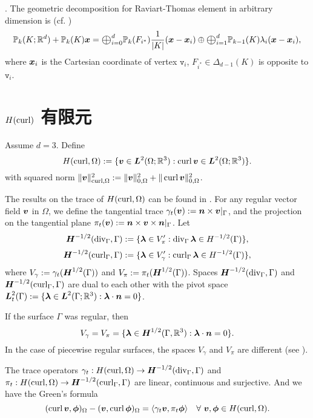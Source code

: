 .
The geometric decomposition for Raviart-Thomas element in arbitrary dimension is (cf. \cite{ArnoldFalkWinther2009})
$$
\mathbb P_k(K;\mathbb R^d)+\mathbb P_k(K)\bs x=\Oplus_{i=0}^d\mathbb P_{k}(F_{i^*})\frac{1}{|K|}(\bs x-\bs x_i) \oplus \Oplus_{i=1}^d\mathbb P_{k-1}(K)\lambda_i(\bs x-\bs x_i),
$$
where $\boldsymbol x_i$ is the Cartesian coordinate of vertex $\texttt{v}_i$, $F_{i^*}\in\Delta_{d-1}(K)$ is opposite to $\texttt{v}_i$.



\section{$H(\operatorname{curl})$ 有限元}

Assume $d=3$.
Define
\[
H(\operatorname{curl},\Omega):=\{\boldsymbol v\in \boldsymbol L^2(\Omega;\mathbb R^3): \operatorname{curl}\boldsymbol v\in \boldsymbol L^2(\Omega;\mathbb R^3)\}.
\]
with squared  norm $\|\boldsymbol v\|_{\operatorname{curl}, \Omega}^2:=\|\boldsymbol v\|_{0, \Omega}^2+\|\operatorname{curl}\boldsymbol v\|_{0, \Omega}^2$.

The results on the trace of $H(\operatorname{curl},\Omega)$ can be found in \cite{BuffaCostabelSheen2002,BuffaCiarlet2001,BuffaCiarlet2001a}.
 For any regular vector field $\boldsymbol v$ in $\Omega$, we define the tangential trace $\gamma_{t}(\boldsymbol v):=\boldsymbol n\times \boldsymbol v|_{\Gamma}$, and the projection on the tangential plane $\pi_{t}(\boldsymbol v):=\boldsymbol n\times\boldsymbol v\times  \boldsymbol n|_{\Gamma}$. Let
 \[
 \boldsymbol H^{-1/2}(\operatorname{div}_{\Gamma}, \Gamma):=\{\boldsymbol\lambda\in V_{\pi}': \operatorname{div}_{\Gamma}\boldsymbol\lambda\in H^{-1/2}(\Gamma)\},
 \]
 \[
 \boldsymbol H^{-1/2}(\operatorname{curl}_{\Gamma}, \Gamma):=\{\boldsymbol\lambda\in V_{\gamma}': \operatorname{curl}_{\Gamma}\boldsymbol\lambda\in H^{-1/2}(\Gamma)\},
 \]
 where $V_{\gamma}:=\gamma_{t}(\boldsymbol H^{1/2}(\Gamma))$ and $V_{\pi}:=\pi_{t}(\boldsymbol H^{1/2}(\Gamma))$.
Spaces $ \boldsymbol H^{-1/2}(\operatorname{div}_{\Gamma}, \Gamma)$ and $ \boldsymbol H^{-1/2}(\operatorname{curl}_{\Gamma}, \Gamma)$ are dual to each other with the pivot space $\boldsymbol L_t^2(\Gamma):=\{\boldsymbol \lambda\in\boldsymbol L^2(\Gamma;\mathbb R^3): \boldsymbol \lambda\cdot\boldsymbol n=0\}$.

If the surface $\Gamma$ was regular, then
\[
V_{\gamma}=V_{\pi}=\{\boldsymbol\lambda\in\boldsymbol H^{1/2}(\Gamma, \mathbb R^3): \boldsymbol\lambda\cdot\boldsymbol n=0\}.
\]
In the case of piecewise regular surfaces, the spaces $V_{\gamma}$ and $V_{\pi}$ are different (see \cite{BuffaCiarlet2001}).

\begin{lemma}
The trace operators $\gamma_{t}:  H(\operatorname{curl},\Omega)\to\boldsymbol H^{-1/2}(\operatorname{div}_{\Gamma}, \Gamma)$ and $\pi_{t}:  H(\operatorname{curl},\Omega)\to\boldsymbol H^{-1/2}(\operatorname{curl}_{\Gamma}, \Gamma)$ are linear, continuous and surjective. And we have the 
Green's formula
\[
(\operatorname{curl}\boldsymbol v, \boldsymbol\phi)_{\Omega} - (\boldsymbol v, \operatorname{curl}\boldsymbol\phi)_{\Omega}=\langle\gamma_t\boldsymbol v, \pi_t\boldsymbol \phi\rangle\quad\forall~\boldsymbol v, \boldsymbol \phi\in H(\operatorname{curl},\Omega).
\]
\end{lemma}

